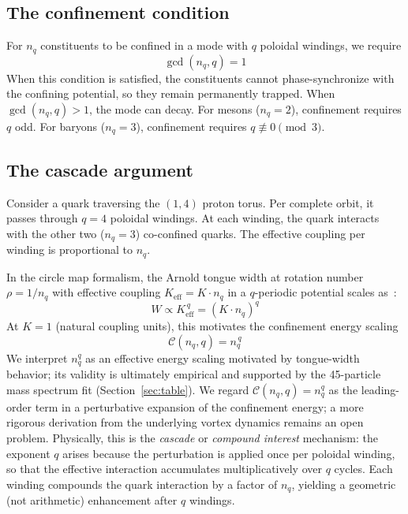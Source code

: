 \documentclass[11pt,a4paper]{article}
\begin{document}
\subsection{The confinement condition}

For $n_q$ constituents to be confined in a mode with $q$ poloidal
windings, we require
\begin{equation}
  \gcd(n_q, q) = 1
  \label{eq:confinement}
\end{equation}
When this condition is satisfied, the constituents cannot
phase-synchronize with the confining potential, so they remain
permanently trapped.  When $\gcd(n_q, q) > 1$, the mode can
decay.  For mesons ($n_q = 2$), confinement requires $q$ odd.
For baryons ($n_q = 3$), confinement requires $q \not\equiv 0
\pmod{3}$.

\subsection{The cascade argument}

Consider a quark traversing the $(1,4)$ proton torus.  Per
complete orbit, it passes through $q = 4$ poloidal windings.
At each winding, the quark interacts with the other two ($n_q = 3$)
co-confined quarks.  The effective coupling per winding is
proportional to $n_q$.

In the circle map formalism, the Arnold tongue width at rotation
number $\rho = 1/n_q$ with effective coupling $K_{\text{eff}} =
K \cdot n_q$ in a $q$-periodic potential scales
as~\cite{Arnold,Cvitanovic}:
\begin{equation}
  W \propto K_{\text{eff}}^{\,q} = (K \cdot n_q)^q
  \label{eq:tongue_width}
\end{equation}
At $K = 1$ (natural coupling units), this motivates the
confinement energy scaling
\begin{equation}
  \mathcal{C}(n_q, q) = n_q^{\,q}
  \label{eq:nqq}
\end{equation}
We interpret $n_q^q$ as an effective energy scaling motivated by
tongue-width behavior; its validity is ultimately empirical and
supported by the 45-particle mass spectrum fit
(Section~\ref{sec:table}).  We regard $\mathcal{C}(n_q, q) = n_q^q$
as the leading-order term in a perturbative expansion of the
confinement energy; a more rigorous derivation from the underlying
vortex dynamics remains an open problem.  Physically, this is the \emph{cascade}
or \emph{compound interest} mechanism:
the exponent $q$ arises because the perturbation is applied once
per poloidal winding, so that the effective interaction accumulates
multiplicatively over $q$ cycles.  Each winding compounds the quark
interaction by a factor of $n_q$, yielding a geometric (not
arithmetic) enhancement after $q$ windings.
\end{document}

